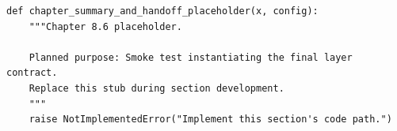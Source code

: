 \begin{lstlisting}[style=bookpython,caption={Planned code placeholder for chapter summary and handoff.},label={lst:ch08-chapter-summary-and-handoff}]
def chapter_summary_and_handoff_placeholder(x, config):
    """Chapter 8.6 placeholder.

    Planned purpose: Smoke test instantiating the final layer contract.
    Replace this stub during section development.
    """
    raise NotImplementedError("Implement this section's code path.")
\end{lstlisting}
